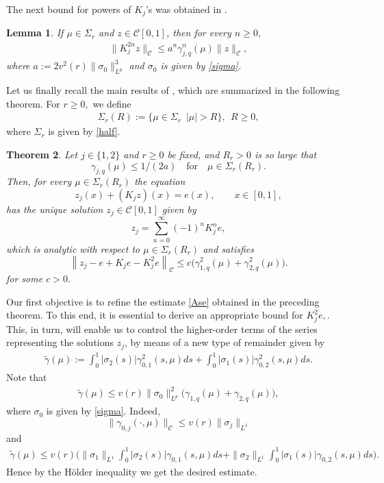 \documentclass[11pt]{amsart}
\theoremstyle{plain}
\newtheorem{thm}{Theorem}[section]
\newtheorem{lem}[thm]{Lemma}
\theoremstyle{definition}
\theoremstyle{remark}
\numberwithin{equation}{section}
\begin{document}
The next bound for powers of $K_j$'s was obtained in \cite{Rzep25}.
\begin{lem}\label{K1M}
If $\mu\in \Sigma_r$ and $z\in \mathcal{C} [0,1]$, then for every $n \ge 0,$%
\begin{align}\label{K120}
\|K_j^{2n}z\|_{\mathcal C}\le  a^n \gamma_{j,q}^n(\mu)\|z\|_{\mathcal C},
\end{align}
where $a:=2v^2(r)\|\sigma_0\|^3_{L^p}$ and $\sigma_0$ is given by \eqref{sigma}.
\end{lem}

Let us finally recall the main results of  \cite{Rzep25},
which are summarized in the following theorem.
For $r\geq0,$ we define
\begin{align}%
\Sigma_r(R):=\{\mu \in \Sigma_r \; \ |\mu| > R \}, \ \ R\geq 0, \label{halfR}
\end{align}
where $\Sigma_r$ is given by \eqref{half}.
\begin{thm}\label{AsG1}
Let $j \in \{1,2\}$ and $r\ge 0$ be fixed, and $R_r>0$ is so large that
\begin{equation}
\label{AA}
\gamma_{j,q}(\mu)\le 1/(2a)\quad \mbox{for}\quad \mu\in \Sigma_r(R_r).
\end{equation}
Then, for every $\mu\in \Sigma_r(R_r)$
the equation
\[
z_j(x)+(K_jz)(x)=e(x), \qquad x \in [0,1],
\]
has the unique solution  $z_j\in \mathcal{C}[0,1]$ given by
\begin{equation}\label{Aeq}
z_j=\sum_{n=0}^\infty (-1)^n K^n_je,
\end{equation}
which is analytic with respect to $\mu \in \Sigma_r(R_r)$ and
satisfies
\begin{equation}\label{Ase}
\left\|z_j-e+K_je-K_j^2e\right\|_\mathcal{C}
\le c \Big(\gamma^2_{1,q}(\mu)+\gamma^2_{2,q}(\mu)\Big).
\end{equation}
for some $c>0.$
\end{thm}

Our first objective is to refine the estimate \eqref{Ase} obtained in the preceding theorem.
To this end, it is essential to derive an appropriate bound for $K^2_je,$.
This, in turn, will enable us to control the higher-order terms of the series representing the solutions
$z_j$, by means of a new type of remainder given by
\begin{align}\label{gammaTilde}
\widetilde{\gamma}(\mu):=\int_0^1|\sigma_2(s)|\gamma^2_{0,1}(s,\mu)ds+\int_0^1|\sigma_1(s)|\gamma^2_{0,2}(s,\mu)ds.
\end{align}
Note that
\begin{align*}
\widetilde{\gamma}(\mu) \leq v(r) \|\sigma_0\|^2_{L^p} \Big(\gamma_{1,q}(\mu) + \gamma_{2,q}(\mu)\Big),
\end{align*}
where $\sigma_0$ is given by \eqref{sigma}. Indeed,
$$\|\gamma_{0,j}(\cdot,\mu)\|_{\mathcal C}\leq v(r)\|\sigma_j\|_{L^1}$$
and
\begin{align*}
\widetilde{\gamma}(\mu) \leq v(r) \Big(\|\sigma_1\|_{L^1}\int_0^1 |\sigma_2(s)|\gamma_{0,1}(s,\mu)ds
+\|\sigma_2\|_{L^1} \int_0^1 |\sigma_1(s)|\gamma_{0,2}(s,\mu)ds\Big).
\end{align*}
Hence by the H\"{o}lder inequality we get the desired estimate.
\end{document}
